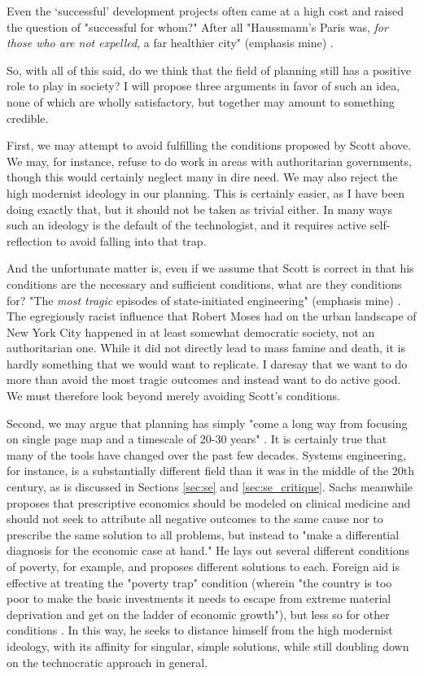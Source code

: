 Even the `successful' development projects often came at a high cost and raised the question of "successful for whom?" After all "Haussmann's Paris was, \textit{for those who are not expelled}, a far healthier city" (emphasis mine) \cite{scottSeeingStateHow2020}.

So, with all of this said, do we think that the field of planning still has a positive role to play in society? I will propose three arguments in favor of such an idea, none of which are wholly satisfactory, but together may amount to something credible.

First, we may attempt to avoid fulfilling the conditions proposed by Scott above. We may, for instance, refuse to do work in areas with authoritarian governments, though this would certainly neglect many in dire need. We may also reject the high modernist ideology in our planning. This is certainly easier, as I have been doing exactly that, but it should not be taken as trivial either. In many ways such an ideology is the default of the technologist, and it requires active self-reflection to avoid falling into that trap. 

And the unfortunate matter is, even if we assume that Scott is correct in that his conditions are the necessary and sufficient conditions, what are they conditions for? "The \textit{most tragic} episodes of state-initiated engineering" (emphasis mine) \cite{scottSeeingStateHow2020}. The egregiously racist influence that Robert Moses had on the urban landscape of New York City \cite{winnerArtifactsHavePolitics1980} happened in at least somewhat democratic society, not an authoritarian one. While it did not directly lead to mass famine and death, it is hardly something that we would want to replicate. I daresay that we want to do more than avoid the most tragic outcomes and instead want to do active good. We must therefore look beyond merely avoiding Scott's conditions.

Second, we may argue that planning has simply "come a long way from focusing on single page map and a timescale of 20-30 years" \cite{robinsonSectionPlanFormulation1972}. It is certainly true that many of the tools have changed over the past few decades. Systems engineering, for instance, is a substantially different field than it was in the middle of the 20th century, as is discussed in Sections \ref{sec:se} and \ref{sec:se_critique}. Sachs meanwhile proposes that prescriptive economics should be modeled on clinical medicine and should not seek to attribute all negative outcomes to the same cause nor to prescribe the same solution to all problems, but instead to "make a differential diagnosis for the economic case at hand." He lays out several different conditions of poverty, for example, and proposes different solutions to each. Foreign aid is effective at treating the "poverty trap" condition (wherein "the country is too poor to make the basic investments it needs to escape from extreme material deprivation and get on the ladder of economic growth"), but less so for other conditions \cite{sachsAgeSustainableDevelopment2015}. In this way, he seeks to distance himself from the high modernist ideology, with its affinity for singular, simple solutions, while still doubling down on the technocratic approach in general. 

